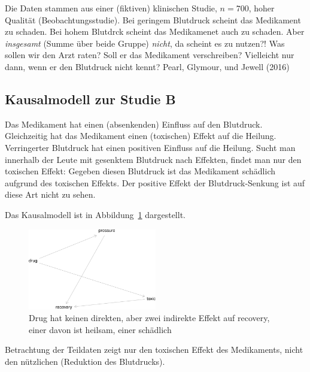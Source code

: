 \documentclass[
  a4paper,
  DIV=11]{scrreprt}
\theoremstyle{definition}
\theoremstyle{remark}
\begin{document}
Die Daten stammen aus einer (fiktiven) klinischen Studie, \(n=700\),
hoher Qualität (Beobachtungsstudie). Bei geringem Blutdruck scheint das
Medikament zu schaden. Bei hohem Blutdrck scheint das Medikamenet auch
zu schaden. Aber \emph{insgesamt} (Summe über beide Gruppe)
\emph{nicht}, da scheint es zu nutzen?! Was sollen wir den Arzt raten?
Soll er das Medikament verschreiben? Vielleicht nur dann, wenn er den
Blutdruck nicht kennt? Pearl, Glymour, und Jewell (2016)

\hypertarget{kausalmodell-zur-studie-b}{%
\subsection{Kausalmodell zur Studie B}\label{kausalmodell-zur-studie-b}}

Das Medikament hat einen (absenkenden) Einfluss auf den Blutdruck.
Gleichzeitig hat das Medikament einen (toxischen) Effekt auf die
Heilung. Verringerter Blutdruck hat einen positiven Einfluss auf die
Heilung. Sucht man innerhalb der Leute mit gesenktem Blutdruck nach
Effekten, findet man nur den toxischen Effekt: Gegeben diesen Blutdruck
ist das Medikament schädlich aufgrund des toxischen Effekts. Der
positive Effekt der Blutdruck-Senkung ist auf diese Art nicht zu sehen.

Das Kausalmodell ist in Abbildung~\ref{fig-dag-studie-b} dargestellt.

\begin{figure}

{\centering \includegraphics[width=0.5\textwidth,height=\textheight]{./kausal_files/figure-pdf/fig-dag-studie-b-1.pdf}

}

\caption{\label{fig-dag-studie-b}Drug hat keinen direkten, aber zwei
indirekte Effekt auf recovery, einer davon ist heilsam, einer schädlich}

\end{figure}

Betrachtung der Teildaten zeigt nur den toxischen Effekt des
Medikaments, nicht den nützlichen (Reduktion des Blutdrucks).
\end{document}
